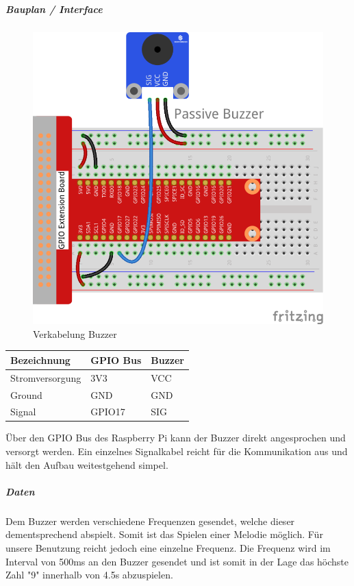 \documentclass[../../main.tex]{subfiles}
\begin{document}
\subparagraph{Bauplan / Interface}

\begin{figure}[H] \centering
  \includegraphics{VerkabelungAkustik}
  \caption{Verkabelung Buzzer}
  \label{fig:Buzzer}
\end{figure}

\begin{table}[] \centering
\begin{tabular}{lll}
Bezeichnung     & GPIO Bus & Buzzer \\ \hline
Stromversorgung & 3V3      & VCC    \\
Ground          & GND      & GND    \\
Signal          & GPIO17   & SIG
\end{tabular}
\end{table}

Über den GPIO Bus des Raspberry Pi kann der Buzzer direkt angesprochen und versorgt werden. Ein einzelnes Signalkabel reicht für die Kommunikation aus und hält den Aufbau weitestgehend simpel.

\subparagraph{Daten}
Dem Buzzer werden verschiedene Frequenzen gesendet, welche dieser dementsprechend abspielt. Somit ist das Spielen einer Melodie möglich. Für unsere Benutzung reicht jedoch eine einzelne Frequenz. Die Frequenz wird im Interval von 500ms an den Buzzer gesendet und ist somit in der Lage das höchste Zahl "9" innerhalb von 4.5s abzuspielen.
\end{document}
